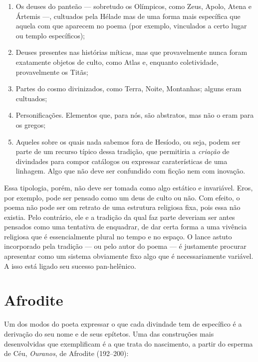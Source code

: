\begin{enumerate}
\item Os deuses do panteão --- sobretudo os Olímpicos, como Zeus, Apolo, Atena e Ártemis ---, cultuados pela Hélade mas de uma forma mais específica que aquela com que aparecem
no poema (por exemplo, vinculados a certo lugar ou templo específicos);

\item Deuses presentes nas histórias míticas, mas que provavelmente nunca
foram exatamente objetos de culto, como Atlas e, enquanto coletividade, provavelmente os Titãs; 

\item Partes do cosmo divinizados, como Terra, Noite, Montanhas; alguns eram cultuados;

\item Personificações. Elementos que,
para nós, são abstratos, mas não o eram para os gregos; 

\item Aqueles sobre os quais nada sabemos fora de Hesíodo, ou seja, podem ser parte de
um recurso típico dessa tradição, que permitiria a \textit{criação} de
divindades para compor catálogos ou expressar caraterísticas de uma
linhagem. Algo que não deve ser confundido com ficção nem com inovação.
\end{enumerate}

Essa tipologia, porém, não deve ser tomada como algo estático e
invariável. Eros, por exemplo, pode ser pensado como um deus de culto ou
não. Com efeito, o poema não pode ser om retrato de uma estrutura
religiosa fixa, pois essa não existia. Pelo contrário, ele e a tradição
da qual faz parte deveriam ser antes pensados como uma tentativa de
enquadrar, de dar certa forma a uma vivência religiosa que é
essencialmente plural no tempo e no espaço. O lance astuto incorporado
pela tradição --- ou pelo autor do poema --- é justamente procurar
apresentar como um sistema obviamente fixo algo que é necessariamente
variável. A isso está ligado seu sucesso pan-helênico.

\section{Afrodite}

Um dos modos do poeta expressar o que cada divindade tem de específico é
a derivação do seu nome e de seus epítetos. Uma das construções mais
desenvolvidas que exemplificam é a que trata do nascimento, a partir do
esperma de Céu, \textit{Ouranos}, de Afrodite (192--200):

